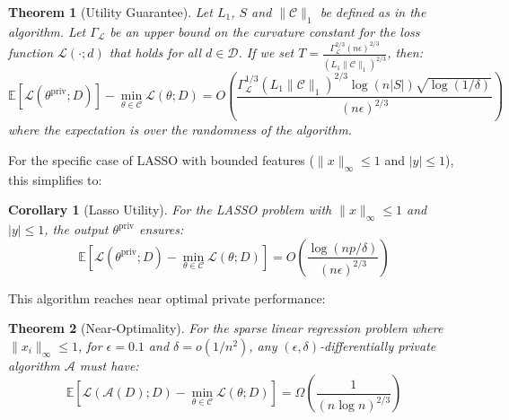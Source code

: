\documentclass[12pt,letterpaper]{article}
\newtheorem{theorem}{Theorem}[section]
\newtheorem{corollary}{Corollary}[theorem]
\begin{document}
\begin{theorem}[Utility Guarantee]
    \label{thm:util}
    Let $L_1$, $S$ and $\|\mathcal{C}\|_1$ be defined as in the algorithm. Let $\Gamma_{\mathcal{L}}$ be an upper bound on the curvature constant for the loss function $\mathcal{L}(\cdot; d)$ that holds for all $d \in \mathcal{D}$. If we set $T = \frac{\Gamma_{\mathcal{L}}^{2/3}(n\epsilon)^{2/3}}{(L_1\|\mathcal{C}\|_1)^{2/3}}$, then:
    \[
    \mathbb{E}[\mathcal{L}(\theta^{\text{priv}}; D)] - \min_{\theta \in \mathcal{C}}\mathcal{L}(\theta; D) = O\left(\frac{\Gamma_{\mathcal{L}}^{1/3}(L_1\|\mathcal{C}\|_1)^{2/3}\log(n|S|)\sqrt{\log(1/\delta)}}{(n\epsilon)^{2/3}}\right)
    \]
    where the expectation is over the randomness of the algorithm.
\end{theorem}

For the specific case of LASSO with bounded features ($\|x\|_{\infty} \leq 1$ and $|y| \leq 1$), this simplifies to:

\begin{corollary}[Lasso Utility]
    \label{thm:utilcor}
    For the LASSO problem with $\|x\|_{\infty} \leq 1$ and $|y| \leq 1$, the output $\theta^{\text{priv}}$ ensures:
    \[
    \mathbb{E}[\mathcal{L}(\theta^{\text{priv}}; D) - \min_{\theta \in \mathcal{C}}\mathcal{L}(\theta; D)] = O\left(\frac{\log(np/\delta)}{(n\epsilon)^{2/3}}\right)
    \]
\end{corollary}

This algorithm reaches near optimal private performance: 

\begin{theorem}[Near-Optimality]
    \label{thm:NearOpt}
    For the sparse linear regression problem where $\|x_i\|_{\infty} \leq 1$, for $\epsilon = 0.1$ and $\delta = o(1/n^2)$, any $(\epsilon, \delta)$-differentially private algorithm $\mathcal{A}$ must have:
    \[
    \mathbb{E}[\mathcal{L}(\mathcal{A}(D); D) - \min_{\theta \in \mathcal{C}}\mathcal{L}(\theta; D)] = \Omega\left(\frac{1}{(n\log n)^{2/3}}\right)
    \]
\end{theorem}
\end{document}
